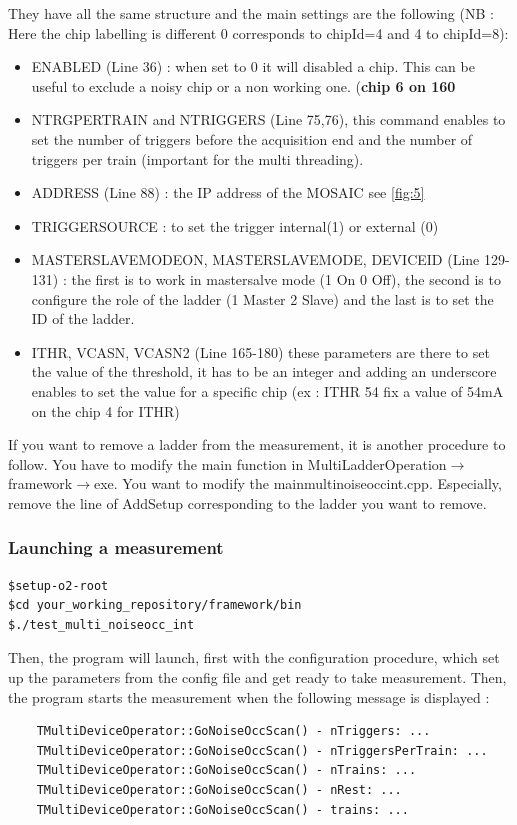 \documentclass[12pt,oneside,a4]{article}
\begin{document}
They have all the same structure and the main settings are the following (NB : Here the chip labelling is different 0 corresponds to chipId=4 and 4 to chipId=8):
\begin{itemize}
    \item ENABLED  (Line 36) : when set to 0 it will disabled a chip. This can be useful to exclude a noisy chip or a non working one. (\textbf{chip 6 on 160}
    \item NTRGPERTRAIN and NTRIGGERS (Line 75,76), this command enables to set the number of triggers before the acquisition end and the number of triggers per train (important for the multi threading).
    \item ADDRESS (Line 88) : the IP address of the MOSAIC see \ref{fig:5}
    \item TRIGGERSOURCE : to set the trigger internal(1) or external (0)
    \item MASTERSLAVEMODEON, MASTERSLAVEMODE, DEVICEID (Line 129-131) : the first is to work in mastersalve mode (1 On 0 Off), the second is to configure the role of the ladder (1 Master 2 Slave) and the last is to set the ID of the ladder.
    \item ITHR, VCASN, VCASN2 (Line 165-180) these parameters are there to set the value of the threshold, it has to be an integer and adding an underscore enables to set the value for a specific chip (ex : ITHR 54 fix a value of 54mA on the chip 4 for ITHR)  
\end{itemize}

If you want to remove a ladder from the measurement, it is another procedure to follow. You have to modify the main function in  MultiLadderOperation$\rightarrow$framework$\rightarrow$exe. You want to modify the main\textunderscore multinoiseocc\textunderscore int.cpp. Especially, remove the line of AddSetup corresponding to the ladder you want to remove. 

\subsubsection{Launching a measurement}


\begin{verbatim}
$setup-o2-root
$cd your_working_repository/framework/bin
$./test_multi_noiseocc_int
\end{verbatim}

Then, the program will launch, first with the configuration procedure, which set up the parameters from the config file and get ready to take measurement. Then, the program starts the measurement when the following message is displayed : 
\begin{verbatim}
    TMultiDeviceOperator::GoNoiseOccScan() - nTriggers: ...
    TMultiDeviceOperator::GoNoiseOccScan() - nTriggersPerTrain: ...
    TMultiDeviceOperator::GoNoiseOccScan() - nTrains: ...
    TMultiDeviceOperator::GoNoiseOccScan() - nRest: ...
    TMultiDeviceOperator::GoNoiseOccScan() - trains: ...
\end{verbatim}
\end{document}
